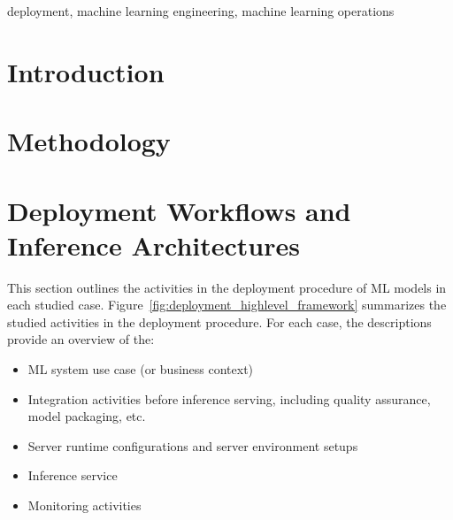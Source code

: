 \documentclass[conference]{IEEEtran}
\begin{document}
\begin{IEEEkeywords}
deployment, machine learning engineering, machine learning operations
\end{IEEEkeywords}

\section{Introduction}
\label{sec: introduction}




\section{Methodology}
\label{sec: methodology}


\section{Deployment Workflows and Inference Architectures}
\label{sec: cases}
This section outlines the activities in the deployment procedure of ML models in each studied case. Figure~\ref{fig:deployment_highlevel_framework} summarizes the studied activities in the deployment procedure. For each case, the descriptions provide an overview of the:
\begin{itemize}
    \item ML system use case (or business context)
    \item Integration activities before inference serving, including quality assurance, model packaging, etc. 
    \item Server runtime configurations and server environment setups
    \item Inference service 
    \item Monitoring activities 
\end{itemize}  

\end{document}
